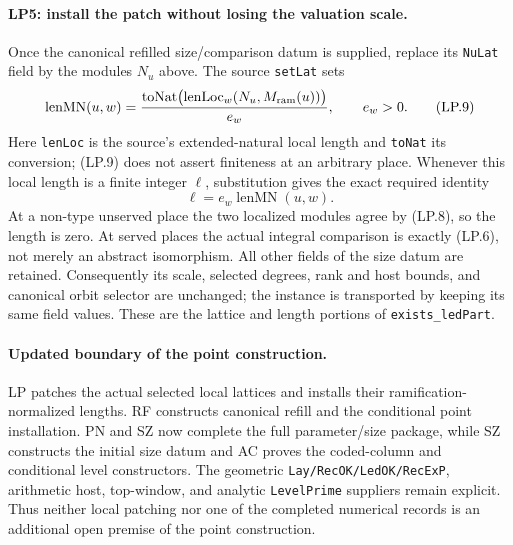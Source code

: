 \documentclass[11pt,a4paper]{article}
\numberwithin{equation}{section}
\theoremstyle{remark}\newtheorem{remark}[theorem]{Remark}
\begin{document}
\paragraph{LP5: install the patch without losing the valuation scale.}
Once the canonical refilled size/comparison datum is supplied, replace
its \texttt{NuLat} field by the modules $N_u$ above. The source
\texttt{setLat} sets
\[
 \operatorname{lenMN}(u,w)
  =\frac{\operatorname{toNat}\bigl(\operatorname{lenLoc}_w
                                      (N_u,M_{\rm ram}(u))\bigr)}{e_w},
              \qquad e_w>0.                                  \tag{LP.9}
\]
Here \texttt{lenLoc} is the source's extended-natural local length
and \texttt{toNat} its conversion; (LP.9) does not assert finiteness
at an arbitrary place. Whenever this local length is a finite integer
$\ell$, substitution gives the exact required identity
\[
                   \ell=e_w\operatorname{lenMN}(u,w).           \tag{LP.10}
\]
At a non-type unserved place the two localized modules agree by
(LP.8), so the length is zero. At served places the actual integral
comparison is exactly (LP.6), not merely an abstract isomorphism.
All other fields of the size datum are retained. Consequently its
scale, selected degrees, rank and host bounds, and canonical orbit
selector are unchanged; the instance is transported by keeping its
same field values. These are the lattice and length portions of
\texttt{exists\_ledPart}.

\paragraph{Updated boundary of the point construction.}
LP patches the actual selected local lattices and installs their
ramification-normalized lengths. RF constructs canonical refill and
the conditional point installation. PN and SZ now complete the full
parameter/size package, while SZ constructs the initial size datum and
AC proves the coded-column and conditional level constructors. The
geometric \texttt{Lay/RecOK/LedOK/RecExP}, arithmetic host, top-window,
and analytic \texttt{LevelPrime} suppliers remain explicit. Thus neither
local patching nor one of the completed numerical records is an
additional open premise of the point construction.
\end{document}
